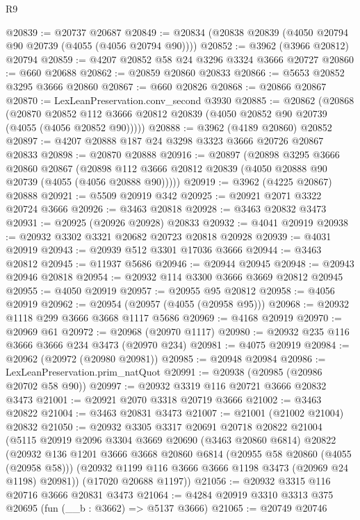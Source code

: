 \begin{lexlean}{R9}
\begin{coremodule}
@20839 := @20737 @20687
@20849 := @20834 (@20838 @20839 (@4050 @20794 @90 @20739 (@4055 (@4056 @20794 @90))))
@20852 := @3962 (@3966 @20812) @20794
@20859 := @4207 @20852 @58 @24 @3296 @3324 @3666 @20727
@20860 := @660 @20688
@20862 := @20859 @20860 @20833
@20866 := @5653 @20852 @3295 @3666 @20860
@20867 := @660 @20826
@20868 := @20866 @20867
@20870 := LexLeanPreservation.conv_second @3930
@20885 := @20862
    (@20868
      (@20870 @20852 @112 @3666 @20812 @20839 (@4050 @20852 @90 @20739 (@4055 (@4056 @20852 @90)))))
@20888 := @3962 (@4189 @20860) @20852
@20897 := @4207 @20888 @187 @24 @3298 @3323 @3666 @20726 @20867 @20833
@20898 := @20870 @20888
@20916 := @20897
    (@20898
      @3295
      @3666
      @20860
      @20867
      (@20898 @112 @3666 @20812 @20839 (@4050 @20888 @90 @20739 (@4055 (@4056 @20888 @90)))))
@20919 := @3962 (@4225 @20867) @20888
@20921 := @5509 @20919 @342
@20925 := @20921 @2071 @3322 @20724 @3666
@20926 := @3463 @20818
@20928 := @3463 @20832 @3473
@20931 := @20925 (@20926 @20928) @20833
@20932 := @4041 @20919
@20938 := @20932 @3302 @3321 @20682 @20723 @20818 @20928
@20939 := @4031 @20919
@20943 := @20939 @512 @3301 @17036 @3666
@20944 := @3463 @20812
@20945 := @11937 @5686
@20946 := @20944 @20945
@20948 := @20943 @20946 @20818
@20954 := @20932 @114 @3300 @3666 @3669 @20812 @20945
@20955 := @4050 @20919
@20957 := @20955 @95 @20812
@20958 := @4056 @20919
@20962 := @20954 (@20957 (@4055 (@20958 @95)))
@20968 := @20932 @1118 @299 @3666 @3668 @1117 @5686
@20969 := @4168 @20919
@20970 := @20969 @61
@20972 := @20968 (@20970 @1117)
@20980 := @20932 @235 @116 @3666 @3666 @234 @3473 (@20970 @234)
@20981 := @4075 @20919
@20984 := @20962 (@20972 (@20980 @20981))
@20985 := @20948 @20984
@20986 := LexLeanPreservation.prim_natQuot
@20991 := @20938 (@20985 (@20986 @20702 @58 @90))
@20997 := @20932 @3319 @116 @20721 @3666 @20832 @3473
@21001 := @20921 @2070 @3318 @20719 @3666
@21002 := @3463 @20822
@21004 := @3463 @20831 @3473
@21007 := @21001 (@21002 @21004) @20832
@21050 := @20932
    @3305
    @3317
    @20691
    @20718
    @20822
    @21004
    (@5115
      @20919
      @2096
      @3304
      @3669
      @20690
      (@3463 @20860 @6814)
      @20822
      (@20932
        @136
        @1201
        @3666
        @3668
        @20860
        @6814
        (@20955 @58 @20860 (@4055 (@20958 @58)))
        (@20932 @1199 @116 @3666 @3666 @1198 @3473 (@20969 @24 @1198) @20981))
      (@17020 @20688 @1197))
@21056 := @20932 @3315 @116 @20716 @3666 @20831 @3473
@21064 := @4284 @20919 @3310 @3313 @375 @20695 (fun (__b : @3662) => @5137 @3666)
@21065 := @20749 @20746

\end{coremodule}
\end{lexlean}
